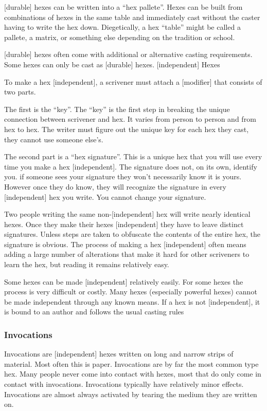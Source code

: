 \documentclass[
  letterpaper,
  DIV=11,
  numbers=noendperiod]{scrartcl}
\begin{document}
{[}durable{]} hexes can be written into a ``hex pallete''. Hexes can be
built from combinations of hexes in the same table and immediately cast
without the caster having to write the hex down. Diegetically, a hex
``table'' might be called a pallete, a matrix, or something else
depending on the tradition or school.

{[}durable{]} hexes often come with additional or alternative casting
requirements. Some hexes can only be cast as {[}durable{]} hexes.
{[}independent{]} Hexes

To make a hex {[}independent{]}, a scrivener must attach a
{[}modifier{]} that consists of two parts.

The first is the ``key''. The ``key'' is the first step in breaking the
unique connection between scrivener and hex. It varies from person to
person and from hex to hex. The writer must figure out the unique key
for each hex they cast, they cannot use someone else's.

The second part is a ``hex signature''. This is a unique hex that you
will use every time you make a hex {[}independent{]}. The signature does
not, on its own, identify you. if someone sees your signature they won't
necessarily know it is yours. However once they do know, they will
recognize the signature in every {[}independent{]} hex you write. You
cannot change your signature.

Two people writing the same non-{[}independent{]} hex will write nearly
identical hexes. Once they make their hexes {[}independent{]} they have
to leave distinct signatures. Unless steps are taken to obfuscate the
contents of the entire hex, the signature is obvious. The process of
making a hex {[}independent{]} often means adding a large number of
alterations that make it hard for other scriveners to learn the hex, but
reading it remains relatively easy.

Some hexes can be made {[}independent{]} relatively easily. For some
hexes the process is very difficult or costly. Many hexes (especially
powerful hexes) cannot be made independent through any known means. If a
hex is not {[}independent{]}, it is bound to an author and follows the
usual casting rules

\subsubsection{Invocations}\label{invocations}

Invocations are {[}independent{]} hexes written on long and narrow
strips of material. Most often this is paper. Invocations are by far the
most common type hex. Many people never come into contact with hexes,
most that do only come in contact with invocations. Invocations
typically have relatively minor effects. Invocations are almost always
activated by tearing the medium they are written on.
\end{document}
